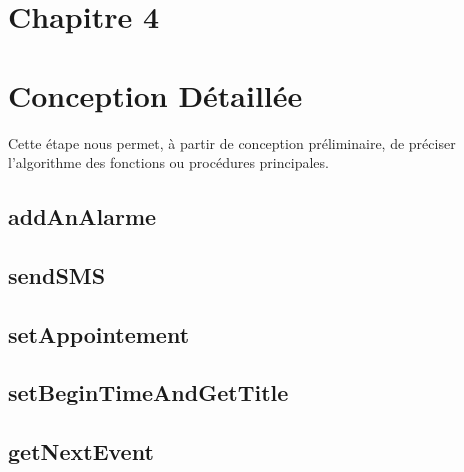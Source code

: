 \section*{Chapitre 4}
\section{Conception Détaillée}
\indent Cette étape nous permet, à partir de conception préliminaire, de préciser l'algorithme des fonctions ou procédures principales.

\subsection{addAnAlarme}
	

\subsection{sendSMS}
	

\subsection{setAppointement}
	

\subsection{setBeginTimeAndGetTitle}
	
	
\subsection{getNextEvent}
	